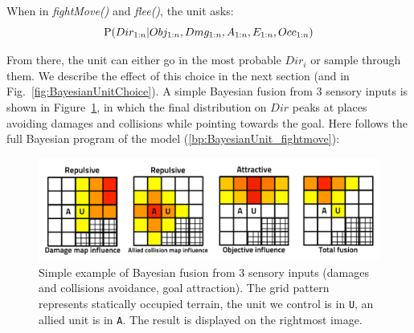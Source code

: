 When in \textit{fightMove()} and \textit{flee()}, the unit asks:
\begin{equation}
\mathrm{P}(Dir_{1:n} | Obj_{1:n}, Dmg_{1:n}, A_{1:n}, E_{1:n}, Occ_{1:n})
\end{equation}

From there, the unit can either go in the most probable $Dir_i$ or sample through them. We describe the effect of this choice in the next section (and in Fig.~\ref{fig:BayesianUnitChoice}). A simple Bayesian fusion from 3 sensory inputs is shown in Figure~\ref{fig:BayesianUnitExample}, in which the final distribution on $Dir$ peaks at places avoiding damages and collisions while pointing towards the goal. Here follows the full Bayesian program of the model (\ref{bp:BayesianUnit_fightmove}):

\begin{figure}[h]
\begin{center}
\includegraphics[width=0.89\columnwidth]{images/example_BayesianUnit.pdf}
\end{center}
\caption{Simple example of Bayesian fusion from 3 sensory inputs (damages and collisions avoidance, goal attraction). The grid pattern represents statically occupied terrain, the unit we control is in \texttt{U}, an allied unit is in \texttt{A}. The result is displayed on the rightmost image.}
\label{fig:BayesianUnitExample}
\end{figure}

